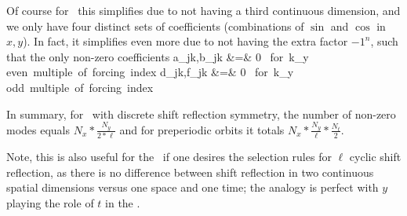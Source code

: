 Of course for \eqva\ this simplifies due to not having a third continuous
dimension, and we only have four distinct sets of coefficients
(combinations of $\sin$ and $\cos$ in $x,y$). In fact, it simplifies even
more due to not having the extra factor $-1^n$, such that the only
non-zero coefficients
\bea
a_{jk},b_{jk} &=& 0 \, \mbox{for}\, k_y \, \mbox{even multiple of forcing index} \continue
d_{jk},f_{jk} &=& 0 \, \mbox{for}\, k_y \, \mbox{odd multiple of forcing index} \continue
\eea

In summary, for \eqva\ with discrete shift reflection symmetry, the number of non-zero
modes equals $N_x*\frac{N_y}{2*\ell}$ and for preperiodic orbits it totals $N_x*\frac{N_y}{\ell}*\frac{N_t}{2}$.

Note, this is also useful for the \KSe\ if one desires the selection
rules for $\ell$ cyclic shift reflection, as there is no difference
between shift reflection in two continuous spatial dimensions versus one
space and one time; the analogy is perfect with $y$ playing the role of
$t$ in the \KSe.


\printbibliography[heading=subbibintoc,title={References}]
